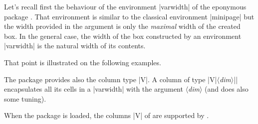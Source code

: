\documentclass[dvipsnames]{article}%
\begin{document}
Let's recall first the behaviour of the environment |{varwidth}| of the
eponymous package . That environment is similar to the classical
environment |{minipage}| but the width provided in the argument is only the
\emph{maximal} width of the created box. In the general case, the width of the
box constructed by an environment |{varwidth}| is the natural width of its
contents.

\medskip
That point is illustrated on the following examples.

\medskip
\begin{Code}[width=6cm]
\end{Code}

\bigskip
\begin{Code}[width=6cm]
\end{Code}


\bigskip
The package  provides also the column type |V|. A column of type
|V{|$\langle$\textsl{dim}$\rangle$|}| encapsulates all its cells in a
|{varwidth}| with the argument $\langle$\textsl{dim}$\rangle$ (and does also some tuning).

\smallskip
When the package  is loaded, the columns |V| of 
are supported by . 
\end{document}
